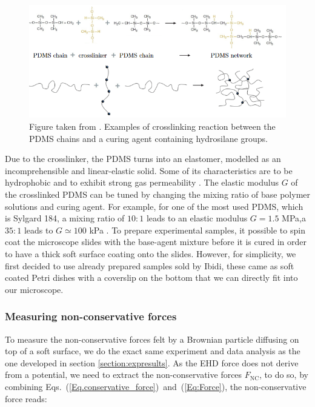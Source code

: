 \begin{figure}[H]
	\centering
	\includegraphics[scale = 0.8]{02_body/chapter4/images/EHD_forces/figure_cross.png}
	\caption{Figure taken from \cite{tucher_analysis_2016}. Examples of crosslinking reaction between the \gls{PDMS} chains and a curing agent containing hydrosilane groups.}
	\label{fig.crosslink}
\end{figure}


Due to the crosslinker, the \gls{PDMS} turns into an elastomer, modelled as an incomprehensible and linear-elastic solid. Some of its characteristics are to be hydrophobic and to exhibit strong gas permeability \cite{xia_soft_1998}. The elastic modulus $G$ of the crosslinked \gls{PDMS} can be tuned by changing the mixing ratio of base polymer solutions and curing agent. For example, for one of the most used \gls{PDMS}, which is Sylgard 184, a mixing ratio of $10:1$ leads to an elastic modulus $G=1.5$ MPa,a $35:1$ leads to $G\simeq 100$ kPa \cite{wang_crosslinking_2014}. To prepare experimental samples, it possible to spin coat the microscope slides with the base-agent mixture before it is cured in order to have a thick soft surface coating onto the slides. However, for simplicity, we first decided to use already prepared samples sold by Ibidi, these came as soft coated Petri dishes with a coverslip on the bottom that we can directly fit into our microscope.


\subsubsection{Measuring non-conservative forces}

To measure the non-conservative forces felt by a Brownian particle diffusing on top of a soft surface, we do the exact same experiment and data analysis as the one developed in section \ref{section:expresults}. As the \gls{EHD} force does not derive from a potential, we need to extract the non-conservative forces $F_\mathrm{NC}$, to do so, by combining Eqs.~(\ref{Eq.conservative_force})~and~(\ref{Eq:Force}), the non-conservative force reads:

